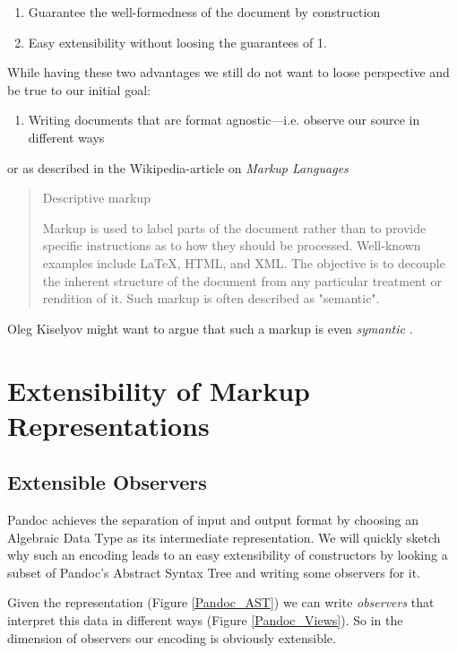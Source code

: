 \documentclass[format=acmsmall, review=true, screen=true, natbib=false]{acmart}
\begin{document}
\begin{enumerate}
\item Guarantee the well-formedness of the document by construction
\item Easy extensibility without loosing the guarantees of 1.
\end{enumerate}

While having these two advantages we still do not want to loose perspective and
be true to our initial goal:

\begin{enumerate}
\item Writing documents that are format agnostic—i.e. observe our source in
different ways
\end{enumerate}

or as described in the Wikipedia-article on \emph{Markup Languages}

\begin{quote}
Descriptive markup

Markup is used to label parts of the document rather than to provide specific
instructions as to how they should be processed. Well-known examples include
\LaTeX{}, HTML, and XML. The objective is to decouple the inherent structure of the
document from any particular treatment or rendition of it. Such markup is often
described as "semantic".
\end{quote}

Oleg Kiselyov might want to argue that such a markup is even \emph{symantic} \cite{finally-tagless-tut}.

\section{Extensibility of Markup Representations}
\label{sec:org7537ecb}
\subsection{Extensible Observers}
\label{sec:org5f9818b}

Pandoc achieves the separation of input and output format by choosing an
Algebraic Data Type as its intermediate representation. We will quickly sketch
why such an encoding leads to an easy extensibility of constructors by looking a
subset of Pandoc's Abstract Syntax Tree and writing some observers for it.

Given the representation (Figure \ref{Pandoc_AST}) we can write \emph{observers}
that interpret this data in different ways (Figure \ref{Pandoc_Views}). So in the
dimension of observers our encoding is obviously extensible.
\end{document}
